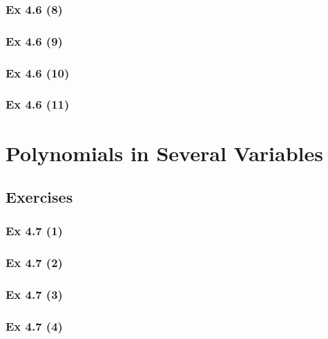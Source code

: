 \subsubsection{Ex 4.6 (8)}\label{sec:Ex_4.6.8}

\subsubsection{Ex 4.6 (9)}\label{sec:Ex_4.6.9}

\subsubsection{Ex 4.6 (10)}\label{sec:Ex_4.6.10}

\subsubsection{Ex 4.6 (11)}\label{sec:Ex_4.6.11}

\newpage		%

\section{Polynomials in Several Variables}\label{sec:4.7}
\subsection{Exercises}\label{sec:4.7_Exercises}

\subsubsection{Ex 4.7 (1)}\label{sec:Ex_4.7.1}

\subsubsection{Ex 4.7 (2)}\label{sec:Ex_4.7.2}

\subsubsection{Ex 4.7 (3)}\label{sec:Ex_4.7.3}

\subsubsection{Ex 4.7 (4)}\label{sec:Ex_4.7.4}

